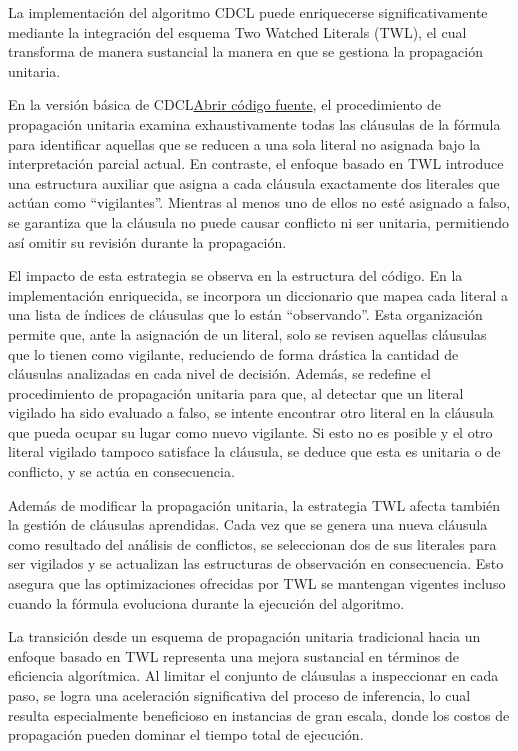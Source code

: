 La implementaci\'on del algoritmo CDCL puede enriquecerse significativamente mediante la integraci\'on del esquema Two Watched Literals (TWL), el cual transforma de manera sustancial la manera en que se gestiona la propagaci\'on unitaria.

En la versi\'on b\'asica de CDCL\href{Graphics/dpll\_cdcl\_sat\_solver.py}{Abrir c\'odigo fuente}, el procedimiento de propagaci\'on unitaria examina exhaustivamente todas las cl\'ausulas de la f\'ormula para identificar aquellas que se reducen a una sola literal no asignada bajo la interpretaci\'on parcial actual. En contraste, el enfoque basado en TWL introduce una estructura auxiliar que asigna a cada cl\'ausula exactamente dos literales que act\'uan como ``vigilantes''. Mientras al menos uno de ellos no est\'e asignado a falso, se garantiza que la cl\'ausula no puede causar conflicto ni ser unitaria, permitiendo as\'i omitir su revisi\'on durante la propagaci\'on.

El impacto de esta estrategia se observa en la estructura del c\'odigo. En la implementaci\'on enriquecida, se incorpora un diccionario que mapea cada literal a una lista de \'indices de cl\'ausulas que lo est\'an ``observando''. Esta organizaci\'on permite que, ante la asignaci\'on de un literal, solo se revisen aquellas cl\'ausulas que lo tienen como vigilante, reduciendo de forma dr\'astica la cantidad de cl\'ausulas analizadas en cada nivel de decisi\'on. Adem\'as, se redefine el procedimiento de propagaci\'on unitaria para que, al detectar que un literal vigilado ha sido evaluado a falso, se intente encontrar otro literal en la cl\'ausula que pueda ocupar su lugar como nuevo vigilante. Si esto no es posible y el otro literal vigilado tampoco satisface la cl\'ausula, se deduce que esta es unitaria o de conflicto, y se act\'ua en consecuencia.

Adem\'as de modificar la propagaci\'on unitaria, la estrategia TWL afecta tambi\'en la gesti\'on de cl\'ausulas aprendidas. Cada vez que se genera una nueva cl\'ausula como resultado del an\'alisis de conflictos, se seleccionan dos de sus literales para ser vigilados y se actualizan las estructuras de observaci\'on en consecuencia. Esto asegura que las optimizaciones ofrecidas por TWL se mantengan vigentes incluso cuando la f\'ormula evoluciona durante la ejecuci\'on del algoritmo.

La transici\'on desde un esquema de propagaci\'on unitaria tradicional hacia un enfoque basado en TWL representa una mejora sustancial en t\'erminos de eficiencia algor\'itmica. Al limitar el conjunto de cl\'ausulas a inspeccionar en cada paso, se logra una aceleraci\'on significativa del proceso de inferencia, lo cual resulta especialmente beneficioso en instancias de gran escala, donde los costos de propagaci\'on pueden dominar el tiempo total de ejecuci\'on.


